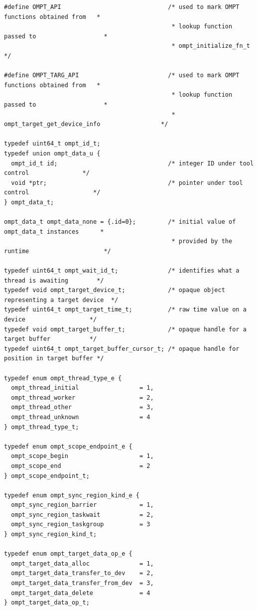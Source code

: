 \documentclass{article}
\begin{document}
\begin{verbatim}
#define OMPT_API                              /* used to mark OMPT functions obtained from   *
                                               * lookup function passed to                   *
                                               * ompt_initialize_fn_t                        */
                                             
#define OMPT_TARG_API                         /* used to mark OMPT functions obtained from   *
                                               * lookup function passed to                   *
                                               * ompt_target_get_device_info                 */
                                             
typedef uint64_t ompt_id_t;
typedef union ompt_data_u {
  ompt_id_t id;                               /* integer ID under tool control               */
  void *ptr;                                  /* pointer under tool control                  */
} ompt_data_t;

ompt_data_t ompt_data_none = {.id=0};         /* initial value of ompt_data_t instances      *
                                               * provided by the runtime                     */

typedef uint64_t ompt_wait_id_t;              /* identifies what a thread is awaiting        */
typedef void ompt_target_device_t;            /* opaque object representing a target device  */
typedef uint64_t ompt_target_time_t;          /* raw time value on a device                  */
typedef void ompt_target_buffer_t;            /* opaque handle for a target buffer           */ 
typedef uint64_t ompt_target_buffer_cursor_t; /* opaque handle for position in target buffer */

typedef enum ompt_thread_type_e {
  ompt_thread_initial                 = 1,
  ompt_thread_worker                  = 2,
  ompt_thread_other                   = 3,
  ompt_thread_unknown                 = 4
} ompt_thread_type_t;

typedef enum ompt_scope_endpoint_e {
  ompt_scope_begin                    = 1,
  ompt_scope_end                      = 2
} ompt_scope_endpoint_t;

typedef enum ompt_sync_region_kind_e {
  ompt_sync_region_barrier            = 1, 
  ompt_sync_region_taskwait           = 2,
  ompt_sync_region_taskgroup          = 3
} ompt_sync_region_kind_t;

typedef enum ompt_target_data_op_e {
  ompt_target_data_alloc              = 1,
  ompt_target_data_transfer_to_dev    = 2,
  ompt_target_data_transfer_from_dev  = 3,
  ompt_target_data_delete             = 4
} ompt_target_data_op_t;


\end{verbatim}
\end{document}
